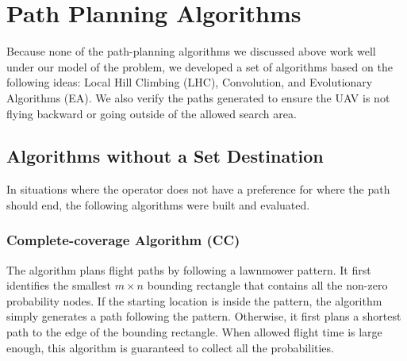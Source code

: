 \documentclass[letterpaper, 10 pt, conference]{ieeeconf}
\begin{document}
\section{Path Planning Algorithms}

Because none of the path-planning algorithms we discussed above work well under our model of the problem, we developed a set of algorithms based on the following ideas: Local Hill Climbing (LHC), Convolution, and Evolutionary Algorithms (EA). We also verify the paths generated to ensure the UAV is not flying backward or going outside of the allowed search area.

\subsection{Algorithms without a Set Destination}

In situations where the operator does not have a preference for where the path should end, the following algorithms were built and evaluated.

\subsubsection{Complete-coverage Algorithm (CC)}

The algorithm plans flight paths by following a lawnmower pattern. It first identifies the smallest $m \!{\times} n$ bounding rectangle that contains all the non-zero probability nodes. If the starting location is inside the pattern, the algorithm simply generates a path following the pattern. Otherwise, it first plans a shortest path to the edge of the bounding rectangle. When allowed flight time is large enough, this algorithm is guaranteed to collect all the probabilities.

%
\end{document}
